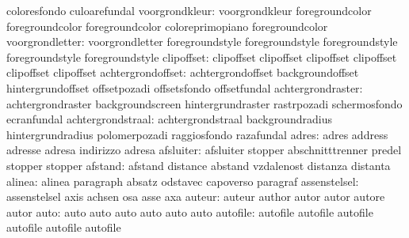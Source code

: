                            coloresfondo              culoarefundal
           voorgrondkleur: voorgrondkleur            foregroundcolor
                           foregroundcolor           foregroundcolor
                           coloreprimopiano          foregroundcolor
          voorgrondletter: voorgrondletter           foregroundstyle
                           foregroundstyle           foregroundstyle
                           foregroundstyle           foregroundstyle
clipoffset: clipoffset   clipoffset
            clipoffset   clipoffset
            clipoffset   clipoffset
        achtergrondoffset: achtergrondoffset         backgroundoffset
                           hintergrundoffset         offsetpozadi
                           offsetsfondo              offsetfundal
        achtergrondraster: achtergrondraster         backgroundscreen
                           hintergrundraster         rastrpozadi
                           schermosfondo             ecranfundal
        achtergrondstraal: achtergrondstraal         backgroundradius
                           hintergrundradius         polomerpozadi
                           raggiosfondo              razafundal
                    adres: adres                     address
                           adresse                   adresa
                           indirizzo                 adresa
                afsluiter: afsluiter                 stopper
                           abschnitttrenner          predel
                           stopper                   stopper
                  afstand: afstand                   distance
                           abstand                   vzdalenost
                           distanza                  distanta
                   alinea: alinea                    paragraph
                           absatz                    odstavec
                           capoverso                 paragraf
             assenstelsel: assenstelsel              axis
                           achsen                    osa
                           asse                      axa
                   auteur: auteur                    author
                           autor                     autor
                           autore                    autor
                     auto: auto                      auto
                           auto                      auto
                           auto                      auto
                 autofile: autofile                  autofile
                           autofile                  autofile
                           autofile                  autofile %
